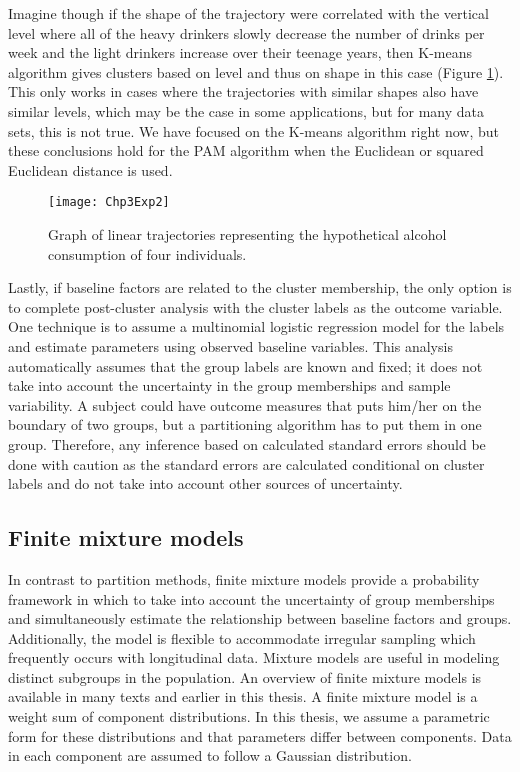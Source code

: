 Imagine though if the shape of the trajectory were correlated with the vertical level where all of the heavy drinkers slowly decrease the number of drinks per week and the light drinkers increase over their teenage years, then K-means algorithm gives clusters based on level and thus on shape in this case (Figure \ref{fig:3-2}). This only works in cases where the trajectories with similar shapes also have similar levels, which may be the case in some applications, but for many data sets, this is not true. We have focused on the K-means algorithm right now, but these conclusions hold for the PAM algorithm when the Euclidean or squared Euclidean distance is used.
\begin{figure}
\begin{center}
\texttt{[image: Chp3Exp2]}
\end{center}
\caption{Graph of linear trajectories representing the hypothetical alcohol consumption of four individuals.}
\label{fig:3-2} 
\end{figure}

Lastly, if baseline factors are related to the cluster membership, the only option is to complete post-cluster analysis with the cluster labels as the outcome variable. One technique is to assume a multinomial logistic regression model for the labels and estimate parameters using observed baseline variables. This analysis automatically assumes that the group labels are known and fixed; it does not take into account the uncertainty in the group memberships and sample variability. A subject could have outcome measures that puts him/her on the boundary of two groups, but a partitioning algorithm has to put them in one group. Therefore, any inference based on calculated standard errors should be done with caution as the standard errors are calculated conditional on cluster labels and do not take into account other sources of uncertainty.

\subsection{Finite mixture models}
In contrast to partition methods, finite mixture models provide a probability framework in which to take into account the uncertainty of group memberships and simultaneously estimate the relationship between baseline factors and groups. Additionally, the model is flexible to accommodate irregular sampling which frequently occurs with longitudinal data. Mixture models are useful in modeling distinct subgroups in the population. An overview of finite mixture models is available in many texts \cite{everitt1981,mclachlan1988,mclachlan2000} and earlier in this thesis. A finite mixture model is a weight sum of component distributions. In this thesis, we assume a parametric form for these distributions and that parameters differ between components. Data in each component are assumed to follow a Gaussian distribution.


